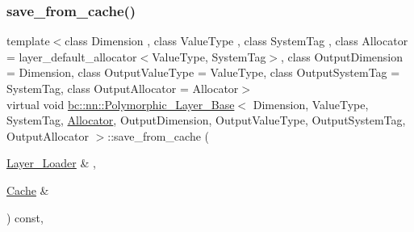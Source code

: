 \subsubsection{\texorpdfstring{save\+\_\+from\+\_\+cache()}{save\_from\_cache()}\hspace{0.1cm}{\footnotesize\ttfamily [1/2]}}
{\footnotesize\ttfamily template$<$class Dimension , class Value\+Type , class System\+Tag , class Allocator  = layer\+\_\+default\+\_\+allocator$<$\+Value\+Type, System\+Tag$>$, class Output\+Dimension  = Dimension, class Output\+Value\+Type  = Value\+Type, class Output\+System\+Tag  = System\+Tag, class Output\+Allocator  = Allocator$>$ \\
virtual void \hyperlink{structbc_1_1nn_1_1Polymorphic__Layer__Base}{bc\+::nn\+::\+Polymorphic\+\_\+\+Layer\+\_\+\+Base}$<$ Dimension, Value\+Type, System\+Tag, \hyperlink{classbc_1_1allocators_1_1Allocator}{Allocator}, Output\+Dimension, Output\+Value\+Type, Output\+System\+Tag, Output\+Allocator $>$\+::save\+\_\+from\+\_\+cache (\begin{DoxyParamCaption}\item[{\hyperlink{structbc_1_1nn_1_1Layer__Loader}{Layer\+\_\+\+Loader} \&}]{,  }\item[{\hyperlink{structbc_1_1nn_1_1Cache}{Cache} \&}]{ }\end{DoxyParamCaption}) const\hspace{0.3cm}{\ttfamily [inline]}, {\ttfamily [virtual]}}

\mbox{\label{structbc_1_1nn_1_1Polymorphic__Layer__Base_a7ec52a754f51ae14d655de2e7ae2e1a6}} 
